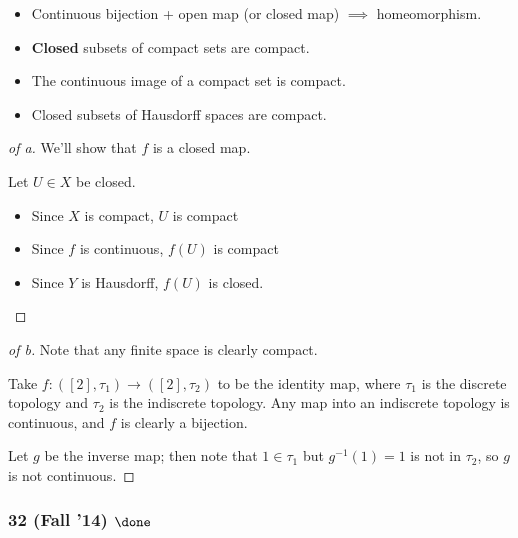 \begin{solution}

\envlist

\begin{concept}

\envlist

\begin{itemize}
\tightlist
\item
  Continuous bijection + open map (or closed map) \(\implies\)
  homeomorphism.
\item
  \textbf{Closed} subsets of compact sets are compact.
\item
  The continuous image of a compact set is compact.
\item
  Closed subsets of Hausdorff spaces are compact.
\end{itemize}

\end{concept}

\begin{proof}[of a]

We'll show that \(f\) is a closed map.

Let \(U \in X\) be closed.

\begin{itemize}
\tightlist
\item
  Since \(X\) is compact, \(U\) is compact
\item
  Since \(f\) is continuous, \(f(U)\) is compact
\item
  Since \(Y\) is Hausdorff, \(f(U)\) is closed.
\end{itemize}

\end{proof}

\begin{proof}[of b]

Note that any finite space is clearly compact.

Take \(f: ([2], \tau_1) \to ([2], \tau_2)\) to be the identity map,
where \(\tau_1\) is the discrete topology and \(\tau_2\) is the
indiscrete topology. Any map into an indiscrete topology is continuous,
and \(f\) is clearly a bijection.

Let \(g\) be the inverse map; then note that \(1 \in \tau_1\) but
\(g^{-1}(1) = 1\) is not in \(\tau_2\), so \(g\) is not continuous.

\end{proof}

\end{solution}

\hypertarget{fall-14-done-1}{%
\subsubsection{\texorpdfstring{32 (Fall '14)
\(\done\)}{32 (Fall '14) \textbackslash done}}\label{fall-14-done-1}}

